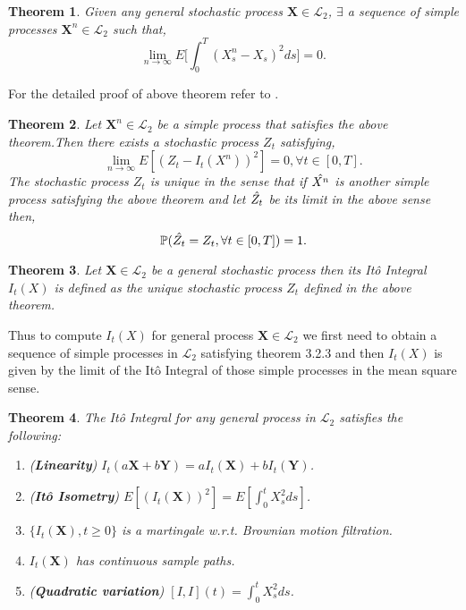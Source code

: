 \documentclass[12pt]{report}
\newtheorem{theorem}{Theorem}[section]
\begin{document}
\begin{theorem}
Given any general stochastic process $\mathbf{X} \in \mathcal{L}_{2}$, $\exists$ a sequence of simple processes $\mathbf{X}^{n} \in \mathcal{L}_{2} $ such that, 
\begin{equation}
    \lim_{n \to \infty}E\Big[\int_{0}^{T}(X_{s}^{n}-X_{s})^{2}ds\Big] = 0.
\end{equation}
\end{theorem}
For the detailed proof of above theorem refer to \cite{resnick_1992}. 
\begin{theorem}
Let $\mathbf{X}^{n} \in \mathcal{L}_{2} $ be a simple process that satisfies the above theorem.Then there exists a stochastic process $Z_t$ satisfying,
\begin{equation}
    \lim_{n \rightarrow \infty} E\left[(Z_t-I_t(X^n))^2\right]=0 ,\forall t \in [0,T].
\end{equation}
The stochastic process $Z_t$ is unique in the sense that if $\Hat{{X}^{n}} $ is another simple process satisfying the above theorem and let $\Hat{Z_t}$ be its limit in the above sense then,
\begin{equation}
  \mathbb{P}(\Hat{Z_t} = Z_t , \forall t \in [0,T]) = 1.
\end{equation}  

\end{theorem}
\begin{theorem}
Let $\mathbf{X} \in \mathcal{L}_{2} $ be a general stochastic process then its Itô Integral $I_t(X)$ is defined as the unique stochastic process $Z_t$ defined in the above theorem. 
\end{theorem}
Thus to compute $I_t(X)$ for general process $\mathbf{X} \in \mathcal{L}_{2} $ we first need to obtain a sequence of simple processes in $\mathcal{L}_{2}$ satisfying theorem 3.2.3 and then $I_t(X)$ is given by the limit of the Itô Integral of those simple processes in the mean square sense.

\begin{theorem}
The Itô Integral for any general process in $\mathcal{L}_{2}$ satisfies the following:
\begin{enumerate}
    \item(\textbf{Linearity}) $I_{t}(a\mathbf{X} + b\mathbf{Y}) = aI_{t}(\mathbf{X})+bI_{t}(\mathbf{Y})$.
    \item(\textbf{Itô Isometry}) $E[(I_{t}(\mathbf{X}))^{2}] = E[\int_{0}^{t}X_{s}^{2}ds]$.
    \item$\{I_{t}(\mathbf{X}) , t \geq 0\}$ is a martingale w.r.t. Brownian motion filtration.
    \item$I_{t}(\mathbf{X})$ has continuous sample paths. 
    \item(\textbf{Quadratic variation}) $[I,I](t) =\int_{0}^{t}X_{s}^{2}ds $.
\end{enumerate}
\end{theorem}
\end{document}
